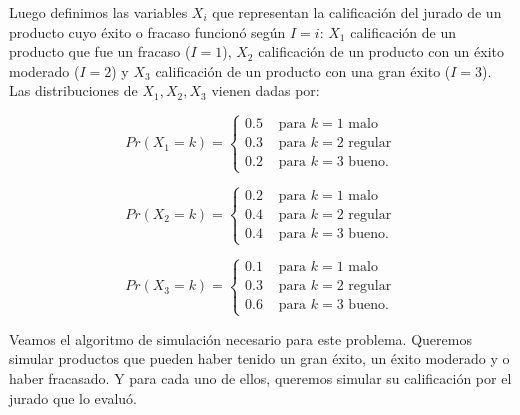\documentclass[
]{book}
\theoremstyle{definition}
\theoremstyle{definition}
\theoremstyle{definition}
\theoremstyle{definition}
\theoremstyle{remark}
\begin{document}
Luego definimos las variables \(X_i\) que representan la calificación del jurado de un producto cuyo éxito o fracaso funcionó según \(I=i\): \(X_1\) calificación de un producto que fue un fracaso (\(I=1\)), \(X_2\) calificación de un producto con un éxito moderado (\(I=2\)) y \(X_3\) calificación de un producto con una gran éxito (\(I=3\)). Las distribuciones de \(X_1, X_2, X_3\) vienen dadas por:

\begin{equation*}
Pr(X_1 = k) = 
\begin{cases}
0.5 & \text{ para } k = 1 \text{ malo}\\
0.3 & \text{ para } k = 2 \text{ regular}\\
0.2 & \text{ para } k = 3 \text{ bueno}.
\end{cases}
\end{equation*}

\begin{equation*}
Pr(X_2 = k) = 
\begin{cases}
0.2 & \text{ para } k = 1 \text{ malo}\\
0.4 & \text{ para } k = 2 \text{ regular}\\
0.4 & \text{ para } k = 3 \text{ bueno}.
\end{cases}
\end{equation*}

\begin{equation*}
Pr(X_3 = k) = 
\begin{cases}
0.1 & \text{ para } k = 1 \text{ malo}\\
0.3 & \text{ para } k = 2 \text{ regular}\\
0.6 & \text{ para } k = 3 \text{ bueno}.
\end{cases}
\end{equation*}

Veamos el algoritmo de simulación necesario para este problema. Queremos simular productos que pueden haber tenido un gran éxito, un éxito moderado y o haber fracasado. Y para cada uno de ellos, queremos simular su calificación por el jurado que lo evaluó.
\end{document}
